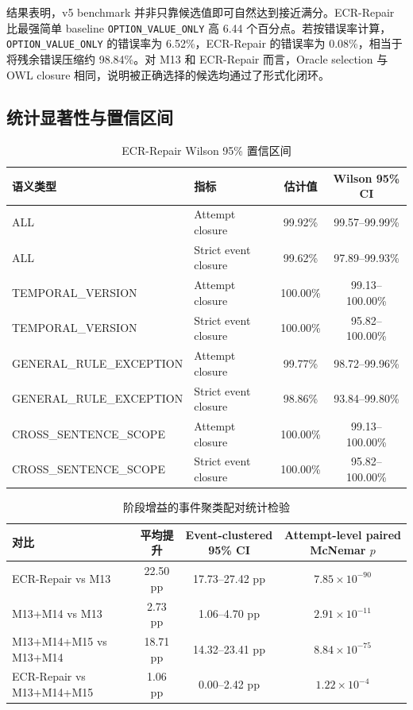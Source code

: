 \documentclass[11pt]{article}
\begin{document}
结果表明，v5 benchmark 并非只靠候选值即可自然达到接近满分。ECR-Repair 比最强简单 baseline \texttt{OPTION\_VALUE\_ONLY} 高 6.44 个百分点。若按错误率计算，\texttt{OPTION\_VALUE\_ONLY} 的错误率为 6.52\%，ECR-Repair 的错误率为 0.08\%，相当于将残余错误压缩约 98.84\%。对 M13 和 ECR-Repair 而言，Oracle selection 与 OWL closure 相同，说明被正确选择的候选均通过了形式化闭环。

\subsection{统计显著性与置信区间}

\begin{table}[t]
\centering
\caption{ECR-Repair Wilson 95\% 置信区间}
\label{tab:ci}
\begin{tabular}{llcc}
\toprule
语义类型 & 指标 & 估计值 & Wilson 95\% CI \\
\midrule
ALL & Attempt closure & 99.92\% & 99.57--99.99\% \\
ALL & Strict event closure & 99.62\% & 97.89--99.93\% \\
TEMPORAL\_VERSION & Attempt closure & 100.00\% & 99.13--100.00\% \\
TEMPORAL\_VERSION & Strict event closure & 100.00\% & 95.82--100.00\% \\
GENERAL\_RULE\_EXCEPTION & Attempt closure & 99.77\% & 98.72--99.96\% \\
GENERAL\_RULE\_EXCEPTION & Strict event closure & 98.86\% & 93.84--99.80\% \\
CROSS\_SENTENCE\_SCOPE & Attempt closure & 100.00\% & 99.13--100.00\% \\
CROSS\_SENTENCE\_SCOPE & Strict event closure & 100.00\% & 95.82--100.00\% \\
\bottomrule
\end{tabular}
\end{table}

\begin{table}[t]
\centering
\caption{阶段增益的事件聚类配对统计检验}
\label{tab:tests}
\begin{tabular}{lccc}
\toprule
对比 & 平均提升 & Event-clustered 95\% CI & Attempt-level paired McNemar $p$ \\
\midrule
ECR-Repair vs M13 & 22.50 pp & 17.73--27.42 pp & $7.85\times10^{-90}$ \\
M13+M14 vs M13 & 2.73 pp & 1.06--4.70 pp & $2.91\times10^{-11}$ \\
M13+M14+M15 vs M13+M14 & 18.71 pp & 14.32--23.41 pp & $8.84\times10^{-75}$ \\
ECR-Repair vs M13+M14+M15 & 1.06 pp & 0.00--2.42 pp & $1.22\times10^{-4}$ \\
\bottomrule
\end{tabular}
\end{table}
\end{document}
